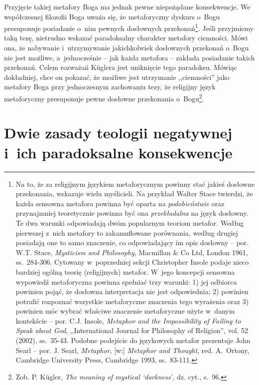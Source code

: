 Przyjęcie takiej metafory Boga ma jednak pewne niepożądane konsekwencje. We współczesnej filozofii Boga uważa się, że metaforyczny dyskurs o~Bogu presuponuje posiadanie o~nim pewnych dosłownych przekonań\footnote{Na to, że za religijnym językiem metaforycznym powinny stać jakieś dosłowne przekonania, wskazuje wielu myślicieli. Na przykład Walter Stace twierdzi, że każda sensowna metafora powinna być oparta na \textit{podobieństwie} oraz przynajmniej teoretycznie powinna być ona \textit{przekładalna} na język dosłowny. Te dwa warunki odpowiadają dwóm popularnym teoriom metafor. Według pierwszej z~nich metafory to zakamuflowane porównania, według drugiej posiadają one to samo znaczenie, co odpowiadający im opis dosłowny -- por. W.T. Stace, \textit{Mysticism and Philosophy}, Macmillan \& Co Ltd, London 1961, ss.~284-306. Cytowany w~poprzedniej sekcji Christopher Insole podaje nieco bardziej ogólną teorię (religijnych) metafor. W~jego koncepcji sensowna wypowiedź metaforyczna powinna spełniać trzy warunki: 1) jej odbiorca powinien pojąć, że dosłowna interpretacja nie jest odpowiednia; 2) powinien potrafić rozpoznać wszystkie metaforyczne znaczenia tego wyrażenia oraz 3) powinien móc wybrać właściwe znaczenie metaforyczne użyte w~danym kontekście -- por. C.J. Insole, \textit{Metaphor and the Impossibility of Failing to Speak about God}, ,,International Journal for Philosophy of Religion'', vol. 52 (2002), ss.~35-43. Podobne podejście do językowych metafor prezentuje John Searl -- por. J. Searl, \textit{Metaphor}, [w:] \textit{Metaphor and Thought}, red. A.~Ortony, Cambridge University Press, Cambridge 1993, ss.~83-111.}. Jeśli przyjmiemy taką tezę, nietrudno wskazać paradoksalny charakter metafory ciemności. Mówi ona, że nabywanie i~utrzymywanie jakichkolwiek dosłownych przekonań o~Bogu nie jest możliwe, a~jednocześnie -- jak każda metafora -- zakłada posiadanie takich przekonań. Celem rozważań Küglera jest uniknięcie tego paradoksu. Mówiąc dokładniej, chce on pokazać, że możliwe jest utrzymanie ,,ciemności'' jako metafory Boga przy jednoczesnym zachowaniu tezy, że religijny język metaforyczny presuponuje pewne dosłowne przekonania o~Bogu\footnote{Zob. P. Kügler, \textit{The meaning of mystical ‘darkness}', dz. cyt., s.~96.}.


\section{Dwie zasady teologii negatywnej i~ich paradoksalne konsekwencje}\label{sil-kug-zasady}

